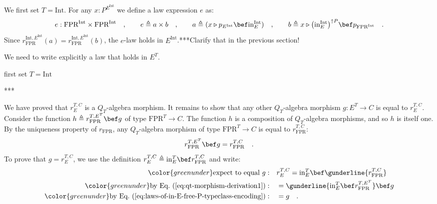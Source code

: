 We first set $T=\text{Int}$. For any $x:P^{E^{\text{Int}}}$ we define
a law expression $e$ as:
\[
e:\text{FPR}^{\text{Int}}\times\text{FPR}^{\text{Int}}\quad,\quad\quad e\triangleq a\times b\quad,\quad\quad a\triangleq(x\triangleright p_{E^{\text{Int}}}\bef\text{in}_{E}^{\text{Int}})\quad,\quad\quad b\triangleq x\triangleright\big(\text{in}_{E}^{\text{Int}}\big)^{\uparrow P}\bef p_{\text{FPR}^{\text{Int}}}\quad.
\]
Since $r_{\text{FPR}}^{\text{Int},E^{\text{Int}}}(a)=r_{\text{FPR}}^{\text{Int},E^{\text{Int}}}(b)$,
the $e$-law holds in $E^{\text{Int}}$.{*}{*}{*}Clarify that in the
previous section! 

We need to write explicitly a law that holds in $E^{T}$.

first set $T=\text{Int}$

{*}{*}{*}

We have proved that $r_{E}^{T,C}$ is a $Q_{T}$-algebra morphism.
It remains to show that any other $Q_{T}$-algebra morphism $g:E^{T}\rightarrow C$
is equal to $r_{E}^{T,C}$. Consider the function $h\triangleq r_{\text{FPR}}^{T,E^{T}}\bef g$
of type $\text{FPR}^{T}\rightarrow C$. The function $h$ is a composition
of $Q_{T}$-algebra morphisms, and so $h$ is itself one. By the uniqueness
property of $r_{\text{FPR}}$, any $Q_{T}$-algebra morphism of type
$\text{FPR}^{T}\rightarrow C$ is equal to $r_{\text{FPR}}^{T,C}$:
\begin{equation}
r_{\text{FPR}}^{T,E^{T}}\bef g=r_{\text{FPR}}^{T,C}\quad.\label{eq:qt-morphism-derivation1}
\end{equation}
To prove that $g=r_{E}^{T,C}$, we use the definition $r_{E}^{T,C}\triangleq\text{in}_{E}^{T}\bef r_{\text{FPR}}^{T,C}$
and write:
\begin{align*}
{\color{greenunder}\text{expect to equal }g:}\quad & r_{E}^{T,C}=\text{in}_{E}^{T}\bef\gunderline{r_{\text{FPR}}^{T,C}}\\
{\color{greenunder}\text{by Eq.~(\ref{eq:qt-morphism-derivation1})}:}\quad & =\gunderline{\text{in}_{E}^{T}\bef r_{\text{FPR}}^{T,E^{T}}}\bef g\\
{\color{greenunder}\text{by Eq.~(\ref{eq:laws-of-in-E-free-P-typeclass-encoding})}:}\quad & =g\quad.
\end{align*}

